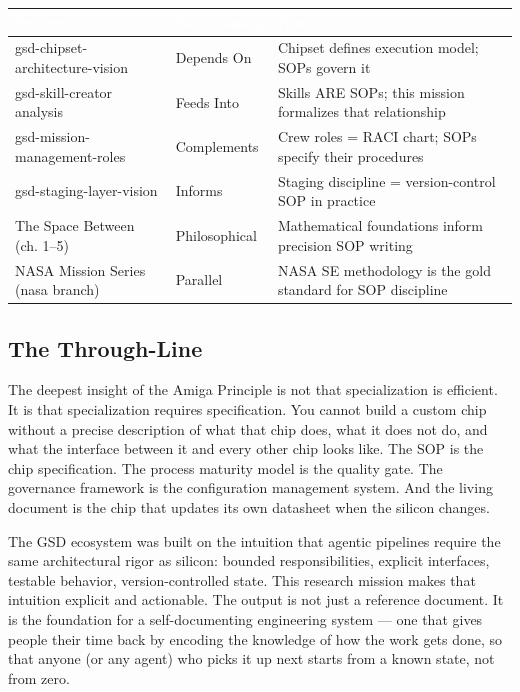 \documentclass[11pt,letterpaper]{article}
\newcommand{\tableheader}[1]{\textbf{\sffamily\textcolor{white}{#1}}}
\begin{document}
\begin{center}
\begin{tabularx}{\textwidth}{L{4.5cm}L{2.5cm}X}
\toprule
{}
\tableheader{Document} & \tableheader{Relationship} & \tableheader{Notes} \\
\midrule
gsd-chipset-architecture-vision & Depends On & Chipset defines execution model; SOPs govern it \\
gsd-skill-creator analysis & Feeds Into & Skills ARE SOPs; this mission formalizes that relationship \\
gsd-mission-management-roles & Complements & Crew roles = RACI chart; SOPs specify their procedures \\
gsd-staging-layer-vision & Informs & Staging discipline = version-control SOP in practice \\
The Space Between (ch. 1--5) & Philosophical & Mathematical foundations inform precision SOP writing \\
NASA Mission Series (nasa branch) & Parallel & NASA SE methodology is the gold standard for SOP discipline \\
\bottomrule
\end{tabularx}
\end{center}

\subsection{The Through-Line}

The deepest insight of the Amiga Principle is not that specialization is efficient. It is that specialization requires specification. You cannot build a custom chip without a precise description of what that chip does, what it does not do, and what the interface between it and every other chip looks like. The SOP is the chip specification. The process maturity model is the quality gate. The governance framework is the configuration management system. And the living document is the chip that updates its own datasheet when the silicon changes.

The GSD ecosystem was built on the intuition that agentic pipelines require the same architectural rigor as silicon: bounded responsibilities, explicit interfaces, testable behavior, version-controlled state. This research mission makes that intuition explicit and actionable. The output is not just a reference document. It is the foundation for a self-documenting engineering system --- one that gives people their time back by encoding the knowledge of how the work gets done, so that anyone (or any agent) who picks it up next starts from a known state, not from zero.
\end{document}
